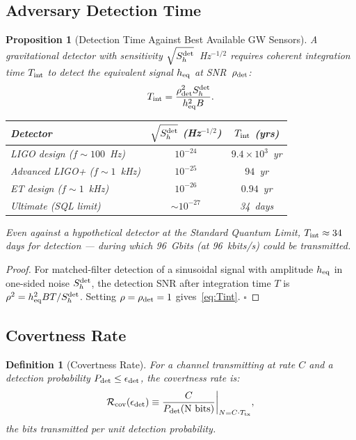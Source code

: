 \documentclass[aps,prd,twocolumn,superscriptaddress,nofootinbib]{revtex4-2}
\newtheorem{proposition}[theorem]{Proposition}
\newtheorem{definition}{Definition}
\begin{document}
\subsection{Adversary Detection Time}

\begin{proposition}[Detection Time Against Best Available GW Sensors]
\label{prop:detect-time}
A gravitational detector with sensitivity $\sqrt{S_h^{\rm det}}$~Hz$^{-1/2}$
requires coherent integration time $T_{\rm int}$ to detect the equivalent
signal $h_{\rm eq}$ at SNR~$\rho_{\rm det}$:
\begin{equation}
T_{\rm int} = \frac{\rho_{\rm det}^2 S_h^{\rm det}}{h_{\rm eq}^2 B}.
\label{eq:Tint}
\end{equation}

\begin{center}
\begin{tabular}{lcc}
\hline\hline
Detector & $\sqrt{S_h^{\rm det}}$ (Hz$^{-1/2}$) & $T_{\rm int}$ (yrs) \\
\hline
LIGO design ($f\sim100$~Hz) & $10^{-24}$ & $9.4\times 10^3$~yr \\
Advanced LIGO+ ($f\sim1$~kHz) & $10^{-25}$ & $94$~yr \\
ET design ($f\sim1$~kHz) & $10^{-26}$ & $0.94$~yr \\
Ultimate (SQL limit) & $\sim 10^{-27}$ & 34~days \\
\hline\hline
\end{tabular}
\end{center}
Even against a hypothetical detector at the Standard Quantum Limit,
$T_{\rm int} \approx 34$ days for detection --- during which 96~Gbits
(at 96~kbits/s) could be transmitted.
\end{proposition}

\begin{proof}
For matched-filter detection of a sinusoidal signal with amplitude
$h_{\rm eq}$ in one-sided noise $S_h^{\rm det}$, the detection SNR after
integration time $T$ is $\rho^2 = h_{\rm eq}^2 B T / S_h^{\rm det}$.
Setting $\rho = \rho_{\rm det} = 1$ gives~\eqref{eq:Tint}. $\square$
\end{proof}

\subsection{Covertness Rate}

\begin{definition}[Covertness Rate]
For a channel transmitting at rate $C$ and a detection probability
$P_{\rm det} \leq \epsilon_{\rm det}$, the covertness rate is:
\begin{equation}
\mathcal{R}_{\rm cov}(\epsilon_{\rm det}) \equiv \frac{C}{P_{\rm det}(\text{N bits})}\bigg|_{N = C \cdot T_{\rm tx}},
\end{equation}
the bits transmitted per unit detection probability.
\end{definition}
\end{document}
